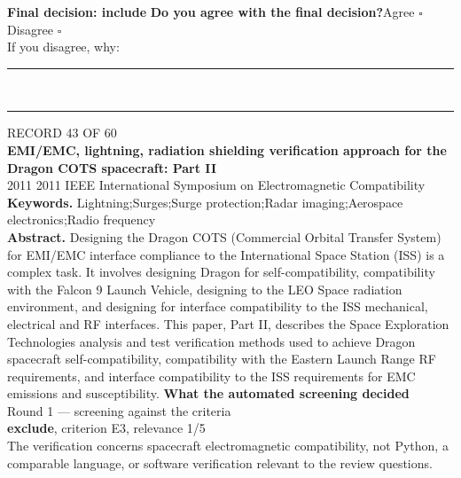 \documentclass[11pt,a4paper]{article}
\begin{document}
{\small\textbf{Final decision: include}}
\vspace{2mm}
{\small\textbf{Do you agree with the final decision?}\quad{}Agree $\square$\qquad{}Disagree $\square$}\\[1mm]
{\footnotesize\color{soft}If you disagree, why:}\\[1mm]
\color{rule}\rule{\linewidth}{0.3pt}\\[3mm]\rule{\linewidth}{0.3pt}\color{black}
\clearpage
{\color{soft}\footnotesize RECORD 43 OF 60}\\[1mm]
{\large\bfseries EMI/EMC, lightning, radiation shielding verification approach for the Dragon COTS spacecraft: Part II}\\[1.5mm]
{\color{soft}\small 2011 \textperiodcentered{} 2011 IEEE International Symposium on Electromagnetic Compatibility}\\[2mm]
{\small\textbf{Keywords.} Lightning;Surges;Surge protection;Radar imaging;Aerospace electronics;Radio frequency}\\[2mm]
{\small\textbf{Abstract.} Designing the Dragon COTS (Commercial Orbital Transfer System) for EMI/EMC interface compliance to the International Space Station (ISS) is a complex task. It involves designing Dragon for self-compatibility, compatibility with the Falcon 9 Launch Vehicle, designing to the LEO Space radiation environment, and designing for interface compatibility to the ISS mechanical, electrical and RF interfaces. This paper, Part II, describes the Space Exploration Technologies analysis and test verification methods used to achieve Dragon spacecraft self-compatibility, compatibility with the Eastern Launch Range RF requirements, and interface compatibility to the ISS requirements for EMC emissions and susceptibility.}
\vspace{3mm}
\vspace{2.5mm}
{\small\textbf{What the automated screening decided}}\\[2mm]
{\footnotesize\color{soft}Round 1 --- screening against the criteria}\\[0.5mm]
{\small\textbf{exclude}, criterion E3, relevance 1/5}\\[0.5mm]
{\small The verification concerns spacecraft electromagnetic compatibility, not Python, a comparable language, or software verification relevant to the review questions.}\\[2.5mm]
\end{document}
